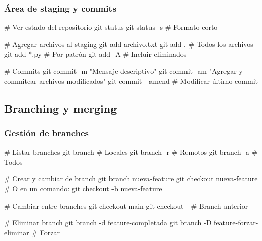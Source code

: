 \documentclass[
  11pt,
  letterpaper,
  oneside,
  openany]{scrbook}
\newenvironment{Shaded}{}{}
\newcommand{\AttributeTok}[1]{\textcolor[rgb]{0.84,0.23,0.29}{#1}}
\newcommand{\CommentTok}[1]{\textcolor[rgb]{0.42,0.45,0.49}{#1}}
\newcommand{\FunctionTok}[1]{\textcolor[rgb]{0.44,0.26,0.76}{#1}}
\newcommand{\NormalTok}[1]{\textcolor[rgb]{0.14,0.16,0.18}{#1}}
\newcommand{\PreprocessorTok}[1]{\textcolor[rgb]{0.84,0.23,0.29}{#1}}
\newcommand{\StringTok}[1]{\textcolor[rgb]{0.01,0.18,0.38}{#1}}
\begin{document}
\subsubsection{Área de staging y
commits}\label{uxe1rea-de-staging-y-commits}

\begin{Shaded}
\begin{Highlighting}[]
\CommentTok{\# Ver estado del repositorio}
\FunctionTok{git}\NormalTok{ status}
\FunctionTok{git}\NormalTok{ status }\AttributeTok{{-}s}  \CommentTok{\# Formato corto}

\CommentTok{\# Agregar archivos al staging}
\FunctionTok{git}\NormalTok{ add archivo.txt}
\FunctionTok{git}\NormalTok{ add .  }\CommentTok{\# Todos los archivos}
\FunctionTok{git}\NormalTok{ add }\PreprocessorTok{*}\NormalTok{.py  }\CommentTok{\# Por patrón}
\FunctionTok{git}\NormalTok{ add }\AttributeTok{{-}A}  \CommentTok{\# Incluir eliminados}

\CommentTok{\# Commits}
\FunctionTok{git}\NormalTok{ commit }\AttributeTok{{-}m} \StringTok{"Mensaje descriptivo"}
\FunctionTok{git}\NormalTok{ commit }\AttributeTok{{-}am} \StringTok{"Agregar y commitear archivos modificados"}
\FunctionTok{git}\NormalTok{ commit }\AttributeTok{{-}{-}amend}  \CommentTok{\# Modificar último commit}
\end{Highlighting}
\end{Shaded}

\subsection{Branching y merging}\label{branching-y-merging}

\subsubsection{Gestión de branches}\label{gestiuxf3n-de-branches}

\begin{Shaded}
\begin{Highlighting}[]
\CommentTok{\# Listar branches}
\FunctionTok{git}\NormalTok{ branch  }\CommentTok{\# Locales}
\FunctionTok{git}\NormalTok{ branch }\AttributeTok{{-}r}  \CommentTok{\# Remotos}
\FunctionTok{git}\NormalTok{ branch }\AttributeTok{{-}a}  \CommentTok{\# Todos}

\CommentTok{\# Crear y cambiar de branch}
\FunctionTok{git}\NormalTok{ branch nueva{-}feature}
\FunctionTok{git}\NormalTok{ checkout nueva{-}feature}
\CommentTok{\# O en un comando:}
\FunctionTok{git}\NormalTok{ checkout }\AttributeTok{{-}b}\NormalTok{ nueva{-}feature}

\CommentTok{\# Cambiar entre branches}
\FunctionTok{git}\NormalTok{ checkout main}
\FunctionTok{git}\NormalTok{ checkout }\AttributeTok{{-}}  \CommentTok{\# Branch anterior}

\CommentTok{\# Eliminar branch}
\FunctionTok{git}\NormalTok{ branch }\AttributeTok{{-}d}\NormalTok{ feature{-}completada}
\FunctionTok{git}\NormalTok{ branch }\AttributeTok{{-}D}\NormalTok{ feature{-}forzar{-}eliminar  }\CommentTok{\# Forzar}
\end{Highlighting}
\end{Shaded}
\end{document}
